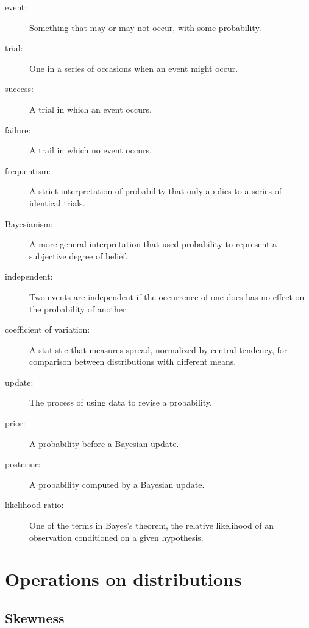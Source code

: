 \documentclass[12pt]{book}
\begin{document}
\begin{description}

\item[event:] Something that may or may not occur, with some probability.

\item[trial:] One in a series of occasions when an event might occur.

\item[success:] A trial in which an event occurs.

\item[failure:] A trail in which no event occurs.

\item[frequentism:] A strict interpretation of probability that only
applies to a series of identical trials.

\item[Bayesianism:] A more general interpretation that used
probability to represent a subjective degree of belief.

\item[independent:] Two events are independent if the occurrence of
one does has no effect on the probability of another.

\item[coefficient of variation:] A statistic that measures spread,
normalized by central tendency, for comparison between distributions
with different means.

\item[update:] The process of using data to revise a probability.

\item[prior:] A probability before a Bayesian update.

\item[posterior:] A probability computed by a Bayesian update.

\item[likelihood ratio:] One of the terms in Bayes's theorem, the
relative likelihood of an observation conditioned on a given hypothesis.

\end{description}



\chapter{Operations on distributions}
\label{operations}

\section{Skewness}
\end{document}
